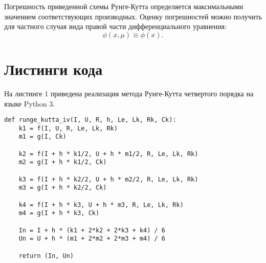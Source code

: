 Погрешность приведенной схемы Рунге-Кутта определяется максимальными значением соответствующих производных. Оценку погрешностей можно получить для частного случая вида правой части дифференциального уравнения:
$$\phi(x,\mu) \equiv \phi(x).$$





\section*{Листинги кода}


На листинге 1 приведена реализация метода Рунге-Кутта четвертого порядка на языке Python 3.

\begin{lstlisting}[caption=Методы Рунге-Кутта четвертого порядка]
def runge_kutta_iv(I, U, R, h, Le, Lk, Rk, Ck):
	k1 = f(I, U, R, Le, Lk, Rk)
	m1 = g(I, Ck)
	
	k2 = f(I + h * k1/2, U + h * m1/2, R, Le, Lk, Rk)
	m2 = g(I + h * k1/2, Ck)
	
	k3 = f(I + h * k2/2, U + h * m2/2, R, Le, Lk, Rk)
	m3 = g(I + h * k2/2, Ck)

	k4 = f(I + h * k3, U + h * m3, R, Le, Lk, Rk)
	m4 = g(I + h * k3, Ck)
	
	In = I + h * (k1 + 2*k2 + 2*k3 + k4) / 6 
	Un = U + h * (m1 + 2*m2 + 2*m3 + m4) / 6
	
	return (In, Un)
\end{lstlisting}


